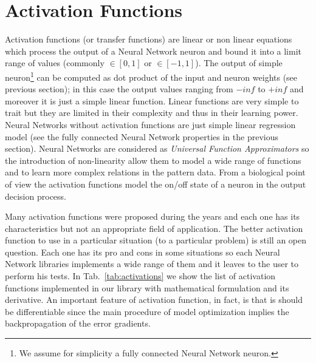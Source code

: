 \documentclass{standalone}
\begin{document}

\section[Activation functions]{Activation Functions}\label{activation}

Activation functions (or transfer functions) are linear or non linear equations which process the output of a Neural Network neuron and bound it into a limit range of values (commonly $\in[0, 1]$ or $\in[-1, 1]$).
The output of simple neuron\footnote{
  We assume for simplicity a fully connected Neural Network neuron.
} can be computed as dot product of the input and neuron weights (see previous section); in this case the output values ranging from $-inf$ to $+inf$ and moreover it is just a simple linear function.
Linear functions are very simple to trait but they are limited in their complexity and thus in their learning power.
Neural Networks without activation functions are just simple linear regression model (see the fully connected Neural Network properties in the previous section).
Neural Networks are considered as \emph{Universal Function Approximators} so the introduction of non-linearity allow them to model a wide range of functions and to learn more complex relations in the pattern data.
From a biological point of view the activation functions model the on/off state of a neuron in the output decision process.

Many activation functions were proposed during the years and each one has its characteristics but not an appropriate field of application.
The better activation function to use in a particular situation (to a particular problem) is still an open question.
Each one has its pro and cons in some situations so each Neural Network libraries implements a wide range of them and it leaves to the user to perform his tests.
In Tab.~\ref{tab:activations} we show the list of activation functions implemented in our library with mathematical formulation and its derivative.
An important feature of activation function, in fact, is that is should be differentiable since the main procedure of model optimization implies the backpropagation of the error gradients.
\end{document}
